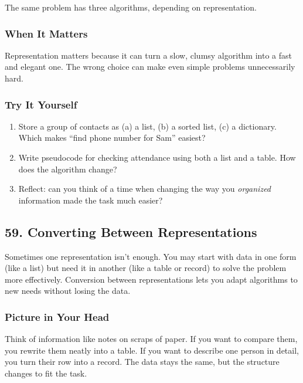 \documentclass[
  letterpaper,
  DIV=11,
  numbers=noendperiod]{scrreprt}
\providecommand{\tightlist}{%
  \setlength{\itemsep}{0pt}\setlength{\parskip}{0pt}}
\begin{document}
The same problem has three algorithms, depending on representation.

\subsubsection{When It Matters}\label{when-it-matters-55}

Representation matters because it can turn a slow, clumsy algorithm into
a fast and elegant one. The wrong choice can make even simple problems
unnecessarily hard.

\subsubsection{Try It Yourself}\label{try-it-yourself-57}

\begin{enumerate}
\def\labelenumi{\arabic{enumi}.}
\tightlist
\item
  Store a group of contacts as (a) a list, (b) a sorted list, (c) a
  dictionary. Which makes ``find phone number for Sam'' easiest?
\item
  Write pseudocode for checking attendance using both a list and a
  table. How does the algorithm change?
\item
  Reflect: can you think of a time when changing the way you
  \emph{organized} information made the task much easier?
\end{enumerate}

\subsection{59. Converting Between
Representations}\label{converting-between-representations}

Sometimes one representation isn't enough. You may start with data in
one form (like a list) but need it in another (like a table or record)
to solve the problem more effectively. Conversion between
representations lets you adapt algorithms to new needs without losing
the data.

\subsubsection{Picture in Your Head}\label{picture-in-your-head-58}

Think of information like notes on scraps of paper. If you want to
compare them, you rewrite them neatly into a table. If you want to
describe one person in detail, you turn their row into a record. The
data stays the same, but the structure changes to fit the task.
\end{document}

